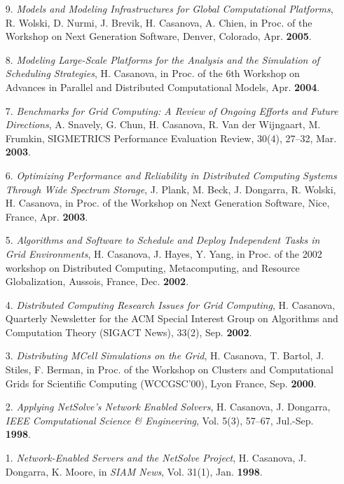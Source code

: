 \begin{enumerate}

\item [9.]
{\it Models and Modeling Infrastructures for Global Computational
Platforms}, R. Wolski, D. Nurmi, J. Brevik, H. Casanova, A. Chien, in
Proc. of the Workshop on Next Generation Software, Denver, Colorado,
Apr. {\bf 2005}.

\item [8.]
{\it Modeling Large-Scale Platforms for the Analysis and
the Simulation of Scheduling Strategies}, H. Casanova, in 
Proc. of the 6th Workshop on Advances in Parallel and
Distributed Computational Models, Apr. {\bf 2004}.

\item [7.]
{\it Benchmarks for Grid Computing: A Review of Ongoing Efforts and Future
Directions}, A. Snavely, G. Chun, H. Casanova, R. Van der Wijngaart,
M. Frumkin, SIGMETRICS Performance Evaluation Review, 30(4), 27--32, Mar.
{\bf 2003}.

\item [6.]
{\it Optimizing Performance and Reliability in Distributed Computing
Systems Through Wide Spectrum Storage}, J. Plank, M. Beck, J. Dongarra,
R. Wolski, H. Casanova, in Proc. of the Workshop on Next Generation
Software, Nice, France, Apr. {\bf 2003}.

\item[5.]
{\it Algorithms and Software to Schedule and Deploy Independent Tasks
in Grid Environments}, H. Casanova, J. Hayes, Y. Yang, in Proc. of
the 2002 workshop on Distributed Computing, Metacomputing, and Resource
Globalization, Aussois, France, Dec. {\bf 2002}.

\item [4.] {\it Distributed Computing Research Issues for Grid Computing},
H. Casanova, Quarterly Newsletter for the ACM Special Interest Group on
Algorithms and Computation Theory (SIGACT News), 33(2), Sep. {\bf 2002}.


\item[3.]
{\it Distributing MCell Simulations on the Grid}, H. Casanova, T. Bartol,
J. Stiles, F. Berman, in Proc. of the Workshop on Clusters and
Computational Grids for Scientific Computing (WCCGSC'00), Lyon France,
Sep. {\bf 2000}.

\item[2.]
{\it Applying NetSolve's Network Enabled Solvers}, H. Casanova,
J. Dongarra, {\em IEEE Computational Science \& Engineering}, Vol. 5(3),
57--67, Jul.-Sep. {\bf 1998}.

\item[1.]
{\it Network-Enabled Servers and the NetSolve Project}, H. Casanova,
J. Dongarra, K. Moore, in \emph{SIAM News}, Vol. 31(1), Jan.
{\bf 1998}.


\end{enumerate}


